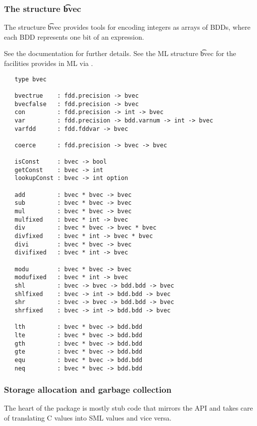 \subsubsection{The \Muddy{} structure \t{bvec}}\label{bvec}

The structure \t{bvec} provides tools for encoding integers as arrays
of BDDs, where each BDD represents one bit of an expression.

See the \Buddy{} documentation \cite{BuDDy} for further details. See the ML structure \t{bvec}
for the \Buddy{} facilities provides in ML via \Muddy{}.

{\footnotesize
\begin{verbatim}
   type bvec

   bvectrue    : fdd.precision -> bvec 
   bvecfalse   : fdd.precision -> bvec 
   con         : fdd.precision -> int -> bvec
   var         : fdd.precision -> bdd.varnum -> int -> bvec
   varfdd      : fdd.fddvar -> bvec

   coerce      : fdd.precision -> bvec -> bvec

   isConst     : bvec -> bool
   getConst    : bvec -> int
   lookupConst : bvec -> int option

   add         : bvec * bvec -> bvec
   sub         : bvec * bvec -> bvec
   mul         : bvec * bvec -> bvec
   mulfixed    : bvec * int -> bvec
   div         : bvec * bvec -> bvec * bvec
   divfixed    : bvec * int -> bvec * bvec
   divi        : bvec * bvec -> bvec
   divifixed   : bvec * int -> bvec

   modu        : bvec * bvec -> bvec
   modufixed   : bvec * int -> bvec
   shl         : bvec -> bvec -> bdd.bdd -> bvec
   shlfixed    : bvec -> int -> bdd.bdd -> bvec
   shr         : bvec -> bvec -> bdd.bdd -> bvec
   shrfixed    : bvec -> int -> bdd.bdd -> bvec

   lth         : bvec * bvec -> bdd.bdd
   lte         : bvec * bvec -> bdd.bdd
   gth         : bvec * bvec -> bdd.bdd
   gte         : bvec * bvec -> bdd.bdd
   equ         : bvec * bvec -> bdd.bdd
   neq         : bvec * bvec -> bdd.bdd
\end{verbatim}}

\subsubsection{Storage allocation and garbage collection}
\label{sec:technical-details}

The heart of the \Muddy{} package is mostly stub code that mirrors the
\Buddy{} API and takes care of translating C values into SML values and
vice versa.

